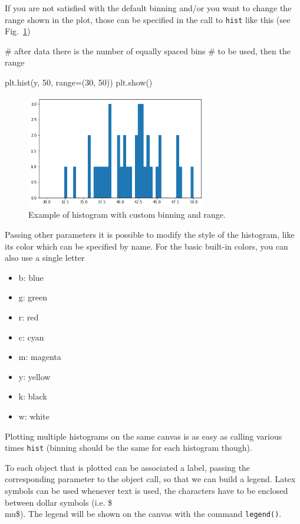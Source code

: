 If you are not satisfied with the default binning and/or you want to change the range shown in the plot, those can be specified in the call to \texttt{hist} like this (see Fig.~\ref{fig:histo2})

\begin{ipython}
# after data there is the number of equally spaced bins
# to be used, then the range

plt.hist(y, 50, range=(30, 50))
plt.show()
\end{ipython}

\begin{figure}[htb]
	\centering
	\includegraphics[width=0.7\textwidth]{figures/histo2}
	\caption{Example of histogram with custom binning and range.}
	\label{fig:histo2}
\end{figure}

Passing other parameters it is possible to modify the style of the
histogram, like its color which can be specified by name. For the basic built-in colors, you can also use a single letter

\begin{itemize}
	\tightlist
	\item
	b: blue
	\item
	g: green
	\item
	r: red
	\item
	c: cyan
	\item
	m: magenta
	\item
	y: yellow
	\item
	k: black
	\item
	w: white
\end{itemize}

Plotting multiple histograms on the same canvas is as easy as calling various times \texttt{hist} (binning should be the same for each histogram though).

To each object that is plotted can be associated a label, passing the corresponding parameter to the object call, so that we can build a legend. Latex symbols can be used whenever text is used, the characters have to be enclosed between dollar symbols (i.e. \$\\mu\$). 
The legend will be shown on the canvas with the command  \texttt{legend()}.

